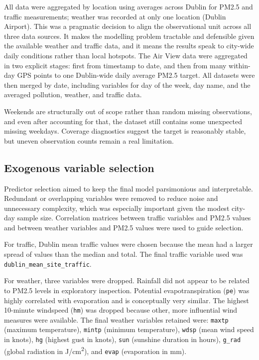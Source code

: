 \documentclass[11pt,a4paper]{article}
\begin{document}
	All data were aggregated by location using averages across Dublin for PM2.5 and traffic measurements; weather was recorded at only one location (Dublin Airport). This was a pragmatic decision to align the observational unit across all three data sources. It makes the modelling problem tractable and defensible given the available weather and traffic data, and it means the results speak to city-wide daily conditions rather than local hotspots. The Air View data were aggregated in two explicit stages: first from timestamp to date, and then from many within-day GPS points to one Dublin-wide daily average PM2.5 target. All datasets were then merged by date, including variables for day of the week, day name, and the averaged pollution, weather, and traffic data.
	
	Weekends are structurally out of scope rather than random missing observations, and even after accounting for that, the dataset still contains some unexpected missing weekdays. Coverage diagnostics suggest the target is reasonably stable, but uneven observation counts remain a real limitation.
	
	\subsection*{Exogenous variable selection}
	
	Predictor selection aimed to keep the final model parsimonious and interpretable. Redundant or overlapping variables were removed to reduce noise and unnecessary complexity, which was especially important given the modest city-day sample size. Correlation matrices between traffic variables and PM2.5 values and between weather variables and PM2.5 values were used to guide selection.
	
	For traffic, Dublin mean traffic values were chosen because the mean had a larger spread of values than the median and total. The final traffic variable used was \texttt{dublin\_mean\_site\_traffic}.
	
	
	For weather, three variables were dropped. Rainfall did not appear to be related to PM2.5 levels in exploratory inspection. Potential evapotranspiration (\texttt{pe}) was highly correlated with evaporation and is conceptually very similar. The highest 10-minute windspeed (\texttt{hm}) was dropped because other, more influential wind measures were available. The final weather variables retained were: \texttt{maxtp} (maximum temperature), \texttt{mintp} (minimum temperature), \texttt{wdsp} (mean wind speed in knots), \texttt{hg} (highest gust in knots), \texttt{sun} (sunshine duration in hours), \texttt{g\_rad} (global radiation in J/cm\textsuperscript{2}), and \texttt{evap} (evaporation in mm).
	
\end{document}
